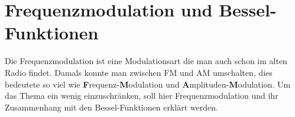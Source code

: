 %
%
% 

\chapter{Frequenzmodulation und Bessel-Funktionen\label{chapter:fm}}
\begin{refsection}


Die Frequenzmodulation ist eine Modulationsart die man auch schon im alten
Radio findet. 
Damals konnte man zwischen FM und AM umschalten, 
dies bedeutete so viel wie
\textbf{F}requenz-\textbf{M}odulation und
\textbf{A}mplituden-\textbf{M}odulation.
Um das Thema ein wenig einzuschränken, soll hier Frequenzmodulation und
ihr Zusammenhang mit den Bessel-Funktionen erklärt werden.







\printbibliography[heading=subbibliography]
\end{refsection}


